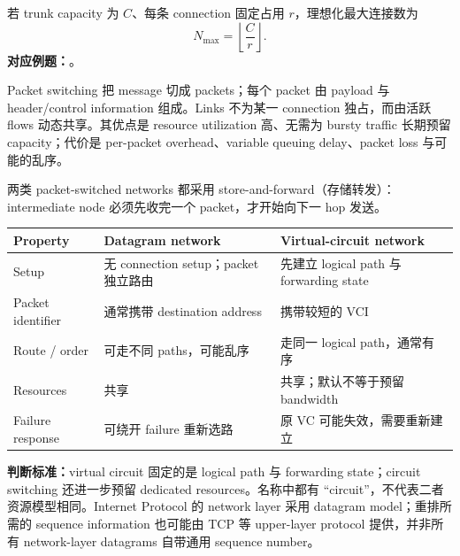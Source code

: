 若 trunk capacity 为 $C$、每条 connection 固定占用 $r$，理想化最大连接数为
\[
  \boxed{N_{\max}=\left\lfloor\frac{C}{r}\right\rfloor}.
\]
\textbf{对应例题：}。


Packet switching 把 message 切成 packets；每个 packet 由 payload 与 header/control information 组成。Links 不为某一 connection 独占，而由活跃 flows 动态共享。其优点是 resource utilization 高、无需为 bursty traffic 长期预留 capacity；代价是 per-packet overhead、variable queuing delay、packet loss 与可能的乱序。

两类 packet-switched networks 都采用 store-and-forward（存储转发）：intermediate node 必须先收完一个 packet，才开始向下一 hop 发送。

\begin{center}
\small
\begin{tabularx}{\textwidth}{@{}>{\raggedright\arraybackslash}p{3.0cm}XX@{}}
  \toprule
  Property & Datagram network & Virtual-circuit network \\
  \midrule
  Setup & 无 connection setup；packet 独立路由 & 先建立 logical path 与 forwarding state \\
  Packet identifier & 通常携带 destination address & 携带较短的 VCI \\
  Route / order & 可走不同 paths，可能乱序 & 走同一 logical path，通常有序 \\
  Resources & 共享 & 共享；默认不等于预留 bandwidth \\
  Failure response & 可绕开 failure 重新选路 & 原 VC 可能失效，需要重新建立 \\
  \bottomrule
\end{tabularx}
\end{center}

\textbf{判断标准：}virtual circuit 固定的是 logical path 与 forwarding state；circuit switching 还进一步预留 dedicated resources。名称中都有 ``circuit''，不代表二者资源模型相同。Internet Protocol 的 network layer 采用 datagram model；重排所需的 sequence information 也可能由 TCP 等 upper-layer protocol 提供，并非所有 network-layer datagrams 自带通用 sequence number。


